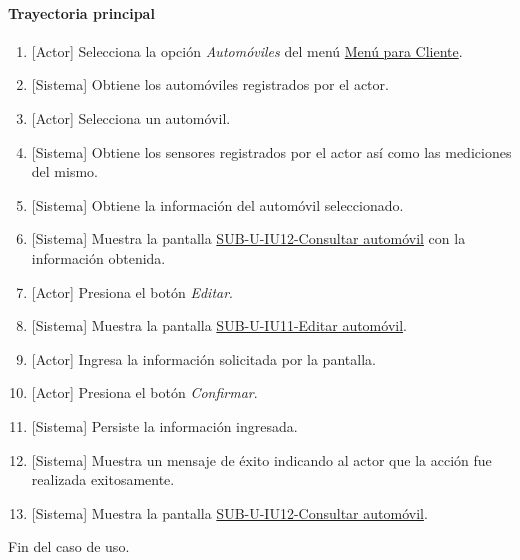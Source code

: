 \paragraph{Trayectoria principal}
	\begin{enumerate}
		\item {[Actor]} Selecciona la opción \textit{Automóviles} del menú \hyperref[fig:menu-cliente]{Menú para Cliente}.
		\item {[Sistema]} Obtiene los automóviles registrados por el actor.
		\item {[Actor]} Selecciona un automóvil.
		\item {[Sistema]} Obtiene los sensores registrados por el actor así como las mediciones del mismo.
		\item {[Sistema]} Obtiene la información del automóvil seleccionado.
		\item {[Sistema]} Muestra la pantalla \hyperref[fig:sub-u-iu12]{SUB-U-IU12-Consultar automóvil} con la información obtenida.
		\item {[Actor]} Presiona el botón \textit{Editar}.
		\item {[Sistema]} Muestra la pantalla \hyperref[fig:sub-u-iu11]{SUB-U-IU11-Editar automóvil}.
		\item {[Actor]} Ingresa la información solicitada por la pantalla.
		\item {[Actor]} Presiona el botón \textit{Confirmar}.
		\item {[Sistema]} Persiste la información ingresada.
		\item {[Sistema]} Muestra un mensaje de éxito indicando al actor que la acción fue realizada exitosamente.
		\item \label{SUB-U-CU11:Pantalla} {[Sistema]} Muestra la pantalla \hyperref[fig:sub-u-iu12]{SUB-U-IU12-Consultar automóvil}.
	\end{enumerate}
	Fin del caso de uso.

